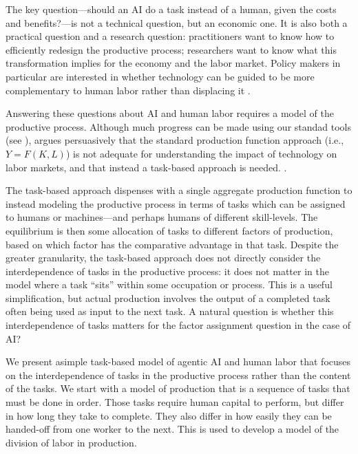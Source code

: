 \documentclass{article}
\begin{document}
The key question---should an AI do a task instead of a human, given the costs and benefits?---is not a technical question, but an economic one.
It is also both a practical question and a research question: practitioners want to know how to efficiently redesign the productive process; researchers want to know what this transformation implies for the economy and the labor market.
Policy makers in particular are interested in whether technology can be guided to be more complementary to human labor rather than displacing it \citep{acemoglu2018automation}.

Answering these questions about AI and human labor requires a model of the productive process.
Although much progress can be made using our standad tools (see \citep{korinek2018artificial}), \cite{acemoglu2024task} argues persuasively that the standard production function approach (i.e., $Y = F(K, L)$) is not adequate for understanding the impact of technology on labor markets, and that instead a task-based approach is needed.
\cite{aghion2024ai}.

The task-based approach dispenses with a single aggregate production function to instead modeling the productive process in terms of tasks which can be assigned to humans or machines---and perhaps humans of different skill-levels.
The equilibrium is then some allocation of tasks to different factors of production, based on which factor has the comparative advantage in that task.
Despite the greater granularity, the task-based approach does not directly consider the interdependence of tasks in the productive process: it does not matter in the model where a task ``sits'' within some occupation or process. 
This is a useful simplification, but actual production involves the output of a completed task often being used as input to the next task.
A natural question is whether this interdependence of tasks matters for the factor assignment question in the case of AI? 

We present asimple task-based model of agentic AI and human labor that focuses on the interdependence of tasks in the productive process rather than the content of the tasks.
We start with a model of production that is a sequence of tasks that must be done in order.
Those tasks require human capital to perform, but differ in how long they take to complete.
They also differ in how easily they can be handed-off from one worker to the next.
This is used to develop a model of the division of labor in production.
\end{document}
